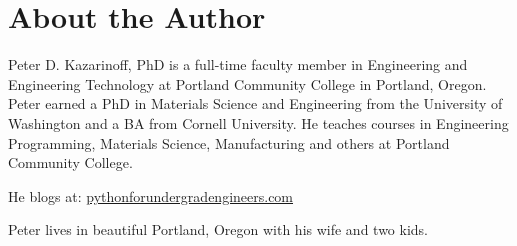 \documentclass{book}
\begin{document}
    
        \hypertarget{about-the-author}{%
\section{About the Author}\label{about-the-author}}
    




    
        Peter D. Kazarinoff, PhD is a full-time faculty member in Engineering
and Engineering Technology at Portland Community College in Portland,
Oregon. Peter earned a PhD in Materials Science and Engineering from the
University of Washington and a BA from Cornell University. He teaches
courses in Engineering Programming, Materials Science, Manufacturing and
others at Portland Community College.

He blogs at:
\href{https://pythonforundergradengineers.com/}{pythonforundergradengineers.com}

Peter lives in beautiful Portland, Oregon with his wife and two kids.
    




    
    
    
    
\end{document}
